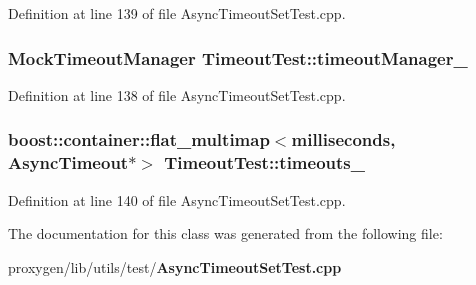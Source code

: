 Definition at line 139 of file Async\+Timeout\+Set\+Test.\+cpp.

\subsubsection[{timeout\+Manager\+\_\+}]{\setlength{\rightskip}{0pt plus 5cm}Mock\+Timeout\+Manager Timeout\+Test\+::timeout\+Manager\+\_\+\hspace{0.3cm}{\ttfamily [protected]}}\label{classTimeoutTest_aaca1adc027eb272eb422df6afd7183f2}


Definition at line 138 of file Async\+Timeout\+Set\+Test.\+cpp.

\subsubsection[{timeouts\+\_\+}]{\setlength{\rightskip}{0pt plus 5cm}boost\+::container\+::flat\+\_\+multimap$<$milliseconds, Async\+Timeout$\ast$$>$ Timeout\+Test\+::timeouts\+\_\+\hspace{0.3cm}{\ttfamily [protected]}}\label{classTimeoutTest_a69e827629a05452eec9827a93c48077e}


Definition at line 140 of file Async\+Timeout\+Set\+Test.\+cpp.



The documentation for this class was generated from the following file\+:\begin{DoxyCompactItemize}
\item 
proxygen/lib/utils/test/{\bf Async\+Timeout\+Set\+Test.\+cpp}\end{DoxyCompactItemize}
